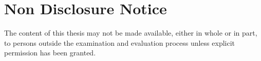 \chapter*{Non Disclosure Notice}

The content of this thesis may not be made available, 
either in whole or in part, to persons outside the examination 
and evaluation process unless explicit permission has been 
granted.

\cleardoublepage
